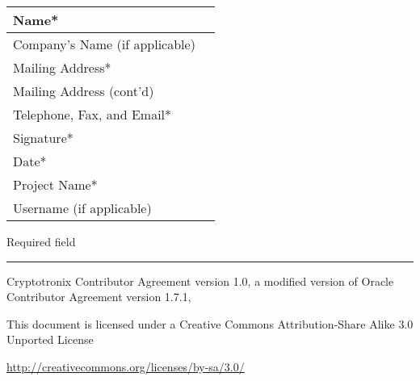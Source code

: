 \documentclass{article}
\begin{document}
\begin{center}
  \begin{tabular}{ | l | p{12cm} | }
    \hline
    Name* &  \\ \hline
    Company's Name (if applicable) &  \\ \hline
    Mailing Address* &  \\ \hline
    Mailing Address (cont'd) &  \\ \hline
    Telephone, Fax, and Email* &  \\ \hline
    Signature* &  \\ \hline
    Date* &  \\ \hline
    Project Name* &  \\ \hline
    Username (if applicable) &  \\ \hline
    \end{tabular}
  \end{center}

  {\footnotesize * Required field}

  \bigskip\hrule\bigskip

  {\footnotesize Cryptotronix Contributor Agreement version
  1.0, a modiﬁed version of Oracle Contributor Agreement version
  1.7.1,

  This document is licensed under a Creative Commons Attribution-Share
  Alike 3.0 Unported License

  \url{http://creativecommons.org/licenses/by-sa/3.0/}}
\end{document}
